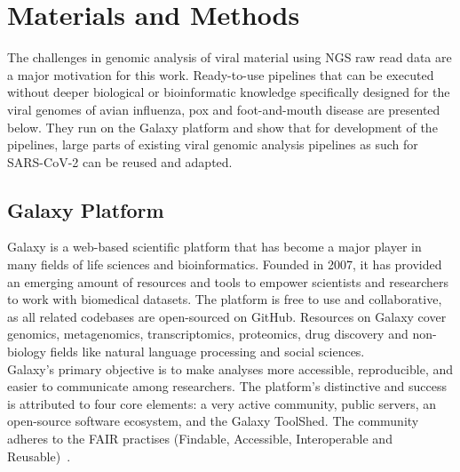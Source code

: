 \chapter{Materials and Methods}\label{chap:methods}
The challenges in genomic analysis of viral material using \ac{NGS} raw read data are a major motivation for this work. Ready-to-use pipelines that can be executed without deeper biological or bioinformatic knowledge specifically designed for the viral genomes of avian influenza, pox and foot-and-mouth disease are presented below. They run on the Galaxy platform and show that for development of the pipelines, large parts of existing viral genomic analysis pipelines as such for SARS-CoV-2 can be reused and adapted.

\section{Galaxy Platform}\label{sec:galaxy}
Galaxy is a web-based scientific platform that has become a major player in many fields of life sciences and bioinformatics. Founded in 2007, it has provided an emerging amount of resources and tools to empower scientists and researchers to work with biomedical datasets. The platform is free to use and collaborative, as all related codebases are open-sourced on GitHub. Resources on Galaxy cover genomics, metagenomics, transcriptomics, proteomics, drug discovery and non-biology fields like natural language processing and social sciences.\\
Galaxy's primary objective is to make analyses more accessible, reproducible, and easier to communicate among researchers. The platform's distinctive and success is attributed to four core elements: a very active community, public servers, an open-source software ecosystem, and the Galaxy ToolShed. The community adheres to the FAIR practises (Findable, Accessible, Interoperable and Reusable)~\cite{10.1093/nar/gkac247}.

